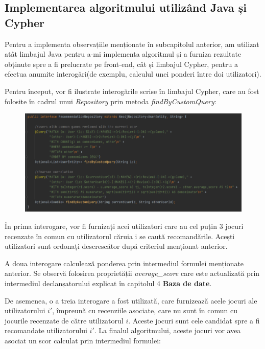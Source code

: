 \documentclass[12pt,a4paper]{report}
\begin{document}
\subsection{Implementarea algoritmului utilizând Java și Cypher}

Pentru a implementa observațiile menționate în subcapitolul anterior, am utilizat atât limbajul Java pentru a-mi implementa algoritmul și a furniza rezultate obținute spre a fi prelucrate pe front-end, cât și limbajul Cypher, pentru a efectua anumite interogări(de exemplu, calculul unei ponderi între doi utilizatori).

Pentru început, vor fi ilustrate interogările scrise în limbajul Cypher, care au fost folosite în cadrul unui \emph{Repository} prin metoda \emph{findByCustomQuery}:

\begin{figure}[H]
\centering
\caption{}
\begin{adjustbox}{max size={\textwidth}{\textheight}}
\includegraphics[scale = 0.7]{exemplu_25_recom_repository}
\end{adjustbox}
\caption*{}
\end{figure}

În prima interogare, vor fi furnizați acei utilizatori care au cel puțin 3 jocuri recenzate în comun cu utilizatorul căruia i se caută recomandările. Acești utilizatori sunt ordonați descrescător după criteriul menționat anterior.

A doua interogare calculează ponderea prin intermediul formulei menționate anterior. Se observă folosirea proprietății \emph{average\_score} care este actualizată prin intermediul declanșatorului explicat în capitolul 4 \textbf{Baza de date}.

\bigskip

De asemenea, o a treia interogare a fost utilizată, care furnizează acele jocuri ale utilizatorului \( i' \), împreună cu recenziile asociate, care nu sunt în comun cu jocurile recenzate de către utilizatorul \( i \). Aceste jocuri sunt cele candidat spre a fi recomandate utilizatorului \( i' \). La finalul algoritmului, aceste jocuri vor avea asociat un scor calculat prin intermediul formulei:
\end{document}
